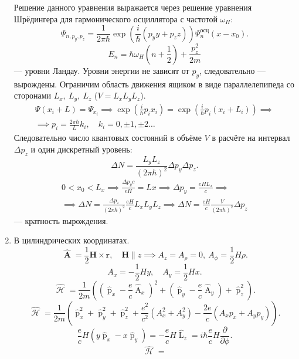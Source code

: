 \documentclass[a4paper]{article}
\begin{document}
\begin{sol}
\begin{enumerate}
Решение данного уравнения выражается
через решение уравнения Шрёдингера для 
гармонического осциллятора с частотой
$\omega_H$:
\[
\Psi_{n,p_y,p_z}= \frac{1}{2\pi \hbar }
\exp \left( \frac{i}{\hbar }
\left( p_y y+p_z z \right) \right) 
\Psi_n^{\text{осц}}(x-x_0)
.\] 
\[
	E_n= \hbar  \omega_H \left( n+\frac{1}{2} \right) + \frac{p_z^2}{2m}
\] 
--- уровни Ландау. Уровни энергии не зависят
от $p_y$, следовательно --- вырождены.
Ограничим область движения ящиком в виде
параллелепипеда со сторонами $L_x,\ L_y,\
L_z$ ($V=L_x L_y L_z$).
\begin{multline*}
	\Psi(x_i+L)=\Psi_{x_i}\implies
	\exp  \left( \frac{i}{\hbar }
	p_i x_i\right) = \exp \left( 
\frac{i}{\hbar } p_i (x_i+L_i)\right) \implies
\\ \implies
	p_i= \frac{2\pi \hbar }{L}
	k_i,\quad k_i= 0,\pm 1,\pm 2\ldots
\end{multline*} 
Следовательно число квантовых состояний
в объёме $V$ в расчёте на интервал $\Delta p_z$ 
и один дискретный уровень:
\[
	\Delta N= \frac{L_y L_z}{(2\pi \hbar )^2}
	\Delta p_y \Delta p_z
.\] 
\begin{multline*}
0<x_0<L_x \implies
\frac{\Delta p_y c}{eH}= Lx \implies
\Delta p_y= \frac{eH L_x}{c}\implies\\\implies
\Delta N= \frac{\Delta p_z}{(2\pi \hbar )^2}
\frac{eH}{c} L_x L_y L_z \implies
\Delta N= \frac{eH}{c} \frac{V}{(2\pi \hbar )^2}
\Delta p_z
\end{multline*} 
--- кратность вырождения.
\item В цилиндрических координатах.
	\[
		\widehat{\operatorname{\mathbf{A}}}=
		\frac{1}{2}
		\mathbf{H}\times
		\mathbf{r},\quad
		\mathbf{H} \parallel z \implies
		A_z=A_\rho=0,\ A_\phi= \frac{1}{2}
		H \rho
	.\] 
\[
A_x= -\frac{1}{2} Hy,\quad A_y= \frac{1}{2}
Hx
.\] 
\[
	\widehat{\operatorname{\mathcal{H}}}
	= \frac{1}{2m} \left( 
	\left( \widehat{\operatorname{p}}_x-
\frac{e}{c} \widehat{\operatorname{A}}_x\right) ^2 +\left( \widehat{\operatorname{p}}_y-
\frac{e}{c} \widehat{\operatorname{A}}_y\right) +\widehat{\operatorname{p}}_z^2\right) 
.\] 
\[
	\widehat{\operatorname{\mathcal{H}}}=
	\frac{1}{2m} \left( 
	\widehat{\operatorname{p}}_x^2 +
\widehat{\operatorname{p}}_y^2 +
\widehat{\operatorname{p}}_z^2 +
\frac{e^2}{c^2} \left( A_x^2 +A_y^2 \right) -
\frac{2e}{c}\left( A_x p_x +A_y p_y \right) \right) 
.\] 
\[
	\frac{e}{c}H\left( y\widehat{\operatorname{p}}_x -x \widehat{\operatorname{p}}_y \right) =
	-\frac{e}{c} H \widehat{\operatorname{L}}_z=
	i \hbar  \frac{e}{c} H \frac{\partial }{\partial \phi} 
.\] 
\[
	\widehat{\operatorname{\mathcal{H}}}=
\]
\end{enumerate}
\end{sol}
\end{document}
